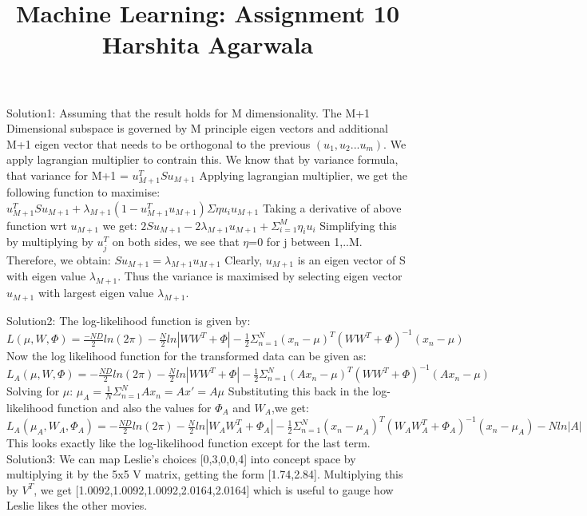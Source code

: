 \documentclass{article}
\begin{document}
\title{Machine Learning: Assignment 10\\
Harshita Agarwala}
\maketitle
\begin{flushleft}
Solution1: Assuming that the result holds for M dimensionality. The M+1 Dimensional subspace is governed by M principle eigen vectors and additional M+1 eigen vector that needs to be orthogonal to the previous $(u_{1},u_{2}...u_{m})$. We apply lagrangian multiplier to contrain this. We know that by variance formula, that variance for M+1 = $u_{M+1}^{T}Su_{M+1}$
Applying lagrangian multiplier, we get the following function to maximise:
$u_{M+1}^{T}Su_{M+1}+ \lambda_{M+1}(1-u_{M+1}^{T}u_{M+1}) \Sigma\eta u_{i}u_{M+1}$ \linebreak
Taking a derivative of above function wrt $u_{M+1}$ we get:\linebreak
$2Su_{M+1} -2\lambda_{M+1}u_{M+1} +\Sigma_{i=1}^{M}\eta_{i} u_{i}$ \linebreak
Simplifying this by multiplying by $u_{j}^{T}$ on both sides, we see that $\eta$=0 for j between 1,..M. Therefore, we obtain:\linebreak
$Su_{M+1}=\lambda_{M+1}u_{M+1}$ \linebreak
Clearly, $u_{M+1}$ is an eigen vector of S with eigen value $\lambda_{M+1}$. Thus the variance is maximised by selecting eigen vector $u_{M+1}$ with largest eigen value $\lambda_{M+1}$. \linebreak

Solution2:
The log-likelihood function is given by:\linebreak
$L(\mu,W,\Phi)=\frac{-ND}{2}ln(2\pi) -\frac{N}{2}ln|WW^{T} + \Phi| - \frac{1}{2}\Sigma_{n=1}^{N}{(x_{n}-\mu)^{T}(WW^{T}+\Phi)^{-1}(x_{n}-\mu)}$ \linebreak
Now the log likelihood function for the transformed data can be given as: \linebreak
$L_{A}(\mu,W,\Phi)=-\frac{ND}{2}ln(2\pi)-\frac{N}{2}ln|WW^{T}+\Phi|-\frac{1}{2}\Sigma_{n=1}^{N}{(Ax_{n}-\mu)^{T}(WW^{T}+\Phi)^{-1}(Ax_{n}-\mu)}$\linebreak
Solving for $\mu$: \linebreak
$\mu_{A}=\frac{1}{N}\Sigma_{n=1}^{N}Ax_{n}=Ax'=A\mu$ \linebreak
Substituting this back in the log-likelihood function and also the values for $\Phi_{A}$ and $W_{A}$,we get:\linebreak
$L_{A}(\mu_{A},W_{A},\Phi_{A})=-\frac{ND}{2}ln(2\pi) -\frac{N}{2}ln|W_{A}W_{A}^{T}+\Phi_{A}|-\frac{1}{2}\Sigma_{n=1}^{N}{(x_{n}-\mu_{A})^{T}(W_{A}W_{A}^{T}+\Phi_{A})^{-1}(x_{n}-\mu_{A})}-Nln|A|$\linebreak
This looks exactly like the log-likelihood function except for the last term.\linebreak
Solution3:
We can map Leslie's choices [0,3,0,0,4] into concept space by multiplying it by the 5x5 V matrix, getting the form [1.74,2.84]. Multiplying this by $V^{T}$, we get [1.0092,1.0092,1.0092,2.0164,2.0164] which is useful to gauge how Leslie likes the other movies. \linebreak
 \end{flushleft}
\end{document}
